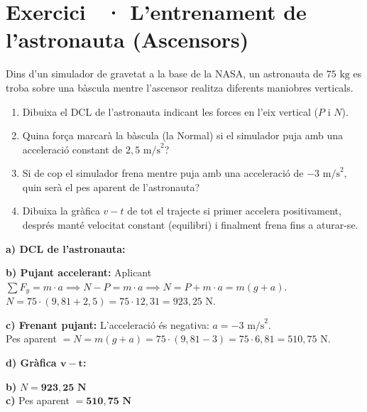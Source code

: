 \documentclass[12pt,a4paper,twoside]{article}
\newcounter{exercici}
\newcommand{\exercici}[1]{%
  \stepcounter{exercici}
  \section*{Exercici \theexercici\ \textnormal{· #1}}
  \vspace{-10pt}
}
\begin{document}
\vspace{0.5cm}
\exercici{L'entrenament de l'astronauta (Ascensors)}
Dins d'un simulador de gravetat a la base de la NASA, un astronauta de $75 \text{ kg}$ es troba sobre una bàscula mentre l'ascensor realitza diferents maniobres verticals.
\begin{enumerate}[label=\textbf{\alph*)}]
  \item Dibuixa el DCL de l'astronauta indicant les forces en l'eix vertical ($P$ i $N$).
  \item Quina força marcarà la bàscula (la Normal) si el simulador puja amb una acceleració constant de $2{,}5 \text{ m/s}^2$?
  \item Si de cop el simulador frena mentre puja amb una acceleració de $-3 \text{ m/s}^2$, quin serà el pes aparent de l'astronauta?
  \item Dibuixa la gràfica $v-t$ de tot el trajecte si primer accelera positivament, després manté velocitat constant (equilibri) i finalment frena fins a aturar-se.
\end{enumerate}

{\color{blue}
\textbf{a) DCL de l'astronauta:}
\begin{center}
\end{center}

\textbf{b) Pujant accelerant:}
Aplicant $\sum F_y = m \cdot a \implies N - P = m \cdot a \implies N = P + m \cdot a = m(g + a)$.\\
$N = 75 \cdot (9{,}81 + 2{,}5) = 75 \cdot 12{,}31 = 923{,}25\text{ N}$.

\textbf{c) Frenant pujant:}
L'acceleració és negativa: $a = -3\text{ m/s}^2$.\\
Pes aparent $= N = m(g + a) = 75 \cdot (9{,}81 - 3) = 75 \cdot 6{,}81 = 510{,}75\text{ N}$.

\textbf{d) Gràfica $\mathbf{v-t}$:}
\begin{center}
\end{center}

\begin{tcolorbox}[title=Respostes Finals,colframe=red!70!black,colback=red!5,sharp corners=south,fontupper=\color{blue}]
\textbf{b)} $N = \mathbf{923{,}25\text{ N}}$\\
\textbf{c)} Pes aparent $= \mathbf{510{,}75\text{ N}}$
\end{tcolorbox}
}
\end{document}
